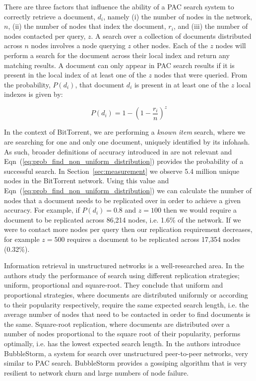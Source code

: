     There are three factors that influence the ability of a PAC search system to correctly retrieve a document, $d_i$, namely (i) the number of nodes in the network, $n$, (ii) the number of nodes that index the document, $r_i$, and (iii) the number of nodes contacted per query, $z$. A search over a collection of documents distributed across $n$ nodes involves a node querying $z$ other nodes. Each of the $z$ nodes will perform a search for the document across their local index and return any matching results. A document can only appear in PAC search results if it is present in the local index of at least one of the $z$ nodes that were queried. From \cite{Cox2009} the probability, $P(d_i)$, that document $d_i$ is present in at least one of the $z$ local indexes is given by:
    
    \begin{equation}
        P(d_i) = 1 - (1-\frac{r_i}{n})^{z}
        \label{eq:prob_find_non_uniform_distribution}
    \end{equation}

    In the context of BitTorrent, we are performing a \emph{known item} search, where we are searching for one and only one document, uniquely identified by its infohash. As such, broader definitions of accuracy introduced in \cite{Asthana2011,Cox} are not relevant and Eqn~(\ref{eq:prob_find_non_uniform_distribution}) provides the probability of a successful search. In Section~\ref{sec:measurement} we observe 5.4 million unique nodes in the BitTorrent network. Using this value and Eqn~(\ref{eq:prob_find_non_uniform_distribution}) we can calculate the number of nodes that a document needs to be replicated over in order to achieve a given accuracy. For example, if $P(d_i)=0.8$ and $z=100$ then we would require a document to be replicated across 86,214 nodes, i.e. 1.6\% of the network. If we were to contact more nodes per query then our replication requirement decreases, for example $z=500$ requires a document to be replicated across 17,354 nodes (0.32\%).

    Information retrieval in unstructured networks is a well-researched area. In \cite{Cohen2002} the authors study the performance of search using different replication strategies; uniform, proportional and square-root. They conclude that uniform and proportional strategies, where documents are distributed uniformly or according to their popularity respectively, require the same expected search length, i.e. the average number of nodes that need to be contacted in order to find documents is the same. Square-root replication, where documents are distributed over a number of nodes proportional to the square root of their popularity, performs optimally, i.e. has the lowest expected search length. In \cite{Terpstra} the authors introduce BubbleStorm, a system for search over unstructured peer-to-peer networks, very similar to PAC search. BubbleStorm provides a gossiping algorithm that is very resilient to network churn and large numbers of node failure. 

